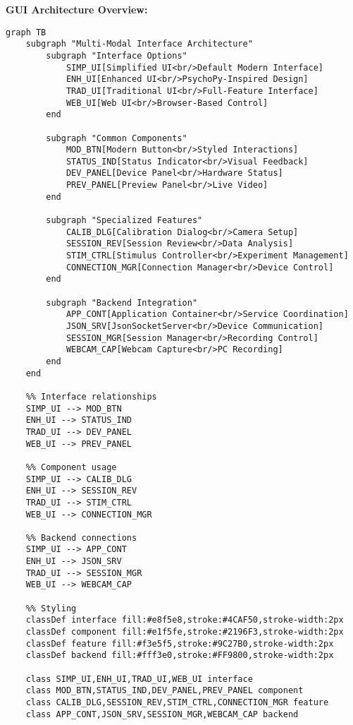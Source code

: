 \documentclass[12pt,a4paper]{article}
\begin{document}
\textbf{GUI Architecture Overview:}

\begin{verbatim}
graph TB
    subgraph "Multi-Modal Interface Architecture"
        subgraph "Interface Options"
            SIMP_UI[Simplified UI<br/>Default Modern Interface]
            ENH_UI[Enhanced UI<br/>PsychoPy-Inspired Design]
            TRAD_UI[Traditional UI<br/>Full-Feature Interface]
            WEB_UI[Web UI<br/>Browser-Based Control]
        end
        
        subgraph "Common Components"
            MOD_BTN[Modern Button<br/>Styled Interactions]
            STATUS_IND[Status Indicator<br/>Visual Feedback]
            DEV_PANEL[Device Panel<br/>Hardware Status]
            PREV_PANEL[Preview Panel<br/>Live Video]
        end
        
        subgraph "Specialized Features"
            CALIB_DLG[Calibration Dialog<br/>Camera Setup]
            SESSION_REV[Session Review<br/>Data Analysis]
            STIM_CTRL[Stimulus Controller<br/>Experiment Management]
            CONNECTION_MGR[Connection Manager<br/>Device Control]
        end
        
        subgraph "Backend Integration"
            APP_CONT[Application Container<br/>Service Coordination]
            JSON_SRV[JsonSocketServer<br/>Device Communication]
            SESSION_MGR[Session Manager<br/>Recording Control]
            WEBCAM_CAP[Webcam Capture<br/>PC Recording]
        end
    end
    
    %% Interface relationships
    SIMP_UI --> MOD_BTN
    ENH_UI --> STATUS_IND
    TRAD_UI --> DEV_PANEL
    WEB_UI --> PREV_PANEL
    
    %% Component usage
    SIMP_UI --> CALIB_DLG
    ENH_UI --> SESSION_REV
    TRAD_UI --> STIM_CTRL
    WEB_UI --> CONNECTION_MGR
    
    %% Backend connections
    SIMP_UI --> APP_CONT
    ENH_UI --> JSON_SRV
    TRAD_UI --> SESSION_MGR
    WEB_UI --> WEBCAM_CAP
    
    %% Styling
    classDef interface fill:#e8f5e8,stroke:#4CAF50,stroke-width:2px
    classDef component fill:#e1f5fe,stroke:#2196F3,stroke-width:2px
    classDef feature fill:#f3e5f5,stroke:#9C27B0,stroke-width:2px
    classDef backend fill:#fff3e0,stroke:#FF9800,stroke-width:2px
    
    class SIMP_UI,ENH_UI,TRAD_UI,WEB_UI interface
    class MOD_BTN,STATUS_IND,DEV_PANEL,PREV_PANEL component
    class CALIB_DLG,SESSION_REV,STIM_CTRL,CONNECTION_MGR feature
    class APP_CONT,JSON_SRV,SESSION_MGR,WEBCAM_CAP backend
\end{verbatim}
\end{document}
